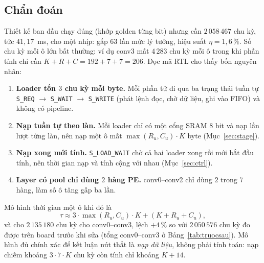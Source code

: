 \subsection{Chẩn đoán}
Thiết kế ban đầu chạy đúng (khớp golden từng bit) nhưng cần $2\,058\,467$ chu kỳ, tức $41{,}17$~ms, cho một nhịp: gấp $63$ lần mức lý tưởng, hiệu suất $\eta=1{,}6\,\%$.
Số chu kỳ mỗi ô lớn bất thường: ví dụ conv3 mất $4\,283$ chu kỳ mỗi ô trong khi phần tính chỉ cần $K+R+C=192+7+7=206$.
Đọc mã RTL cho thấy bốn nguyên nhân:
\begin{enumerate}
  \item \textbf{Loader tốn $3$ chu kỳ mỗi byte.} Mỗi phần tử đi qua ba trạng thái tuần tự \texttt{S\_REQ} $\to$ \texttt{S\_WAIT} $\to$ \texttt{S\_WRITE} (phát lệnh đọc, chờ dữ liệu, ghi vào FIFO) và không có pipeline.
  \item \textbf{Nạp tuần tự theo làn.} Mỗi loader chỉ có một cổng SRAM $8$ bit và nạp lần lượt từng làn, nên nạp một ô mất $\max(R_u,C_u)\cdot K$ byte (Mục~\ref{sec:stage}).
  \item \textbf{Nạp xong mới tính.} \texttt{S\_LOAD\_WAIT} chờ cả hai loader xong rồi mới bắt đầu tính, nên thời gian nạp và tính cộng với nhau (Mục~\ref{sec:ctrl}).
  \item \textbf{Layer có pool chỉ dùng $2$ hàng PE.} conv0--conv2 chỉ dùng $2$ trong $7$ hàng, làm số ô tăng gấp ba lần.
\end{enumerate}
Mô hình thời gian một ô khi đó là
\begin{equation}\label{eq:otile-cu}
  \tau\approx3\cdot\max(R_u,C_u)\cdot K+(K+R_u+C_u),
\end{equation}
và cho $2\,135\,180$ chu kỳ cho conv0--conv3, lệch $+4\,\%$ so với $2\,050\,576$ chu kỳ đo được trên board trước khi sửa (tổng conv0--conv3 ở Bảng~\ref{tab:truocsau}).
Mô hình đủ chính xác để kết luận nút thắt là \emph{nạp dữ liệu}, không phải tính toán: nạp chiếm khoảng $3\cdot7\cdot K$ chu kỳ còn tính chỉ khoảng $K+14$.

